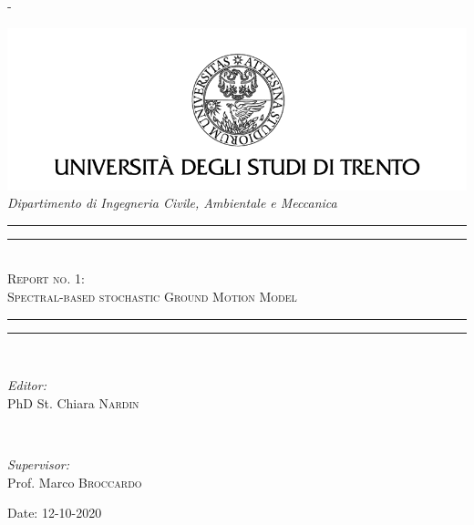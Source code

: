 \begin{titlingpage}
\begin{SingleSpace}
\calccentering{\unitlength} 
\begin{adjustwidth*}{\unitlength}{-\unitlength}
\begin{center}
\includegraphics[scale=1.5]{images/logo_bn.png}\\
{\Large \textit{Dipartimento di Ingegneria Civile, Ambientale e Meccanica}}\\
\vspace{5 mm}
\rule[0.5ex]{\linewidth}{2pt}\vspace*{-\baselineskip}\vspace*{3.2pt}
\rule[0.5ex]{\linewidth}{1pt}\\[\baselineskip]
{\Large \textsc{Report no. 1:}}\\[2.5mm]
{\Large \textsc{Spectral-based stochastic Ground Motion Model}}\\[2.5mm]
\rule[0.5ex]{\linewidth}{1pt}\vspace*{-\baselineskip}\vspace{3.2pt}
\rule[0.5ex]{\linewidth}{2pt}\\

\vspace{2.0cm}
\begin{minipage}[t]{0.5\textwidth}
\begin{flushleft} \large
\emph{Editor:} \\
PhD St. Chiara \textsc{Nardin}\\
\vspace{2.5cm}
\end{flushleft}
\end{minipage}
~
\begin{minipage}[t]{0.4\textwidth}
\begin{flushright} \large
\emph{Supervisor:}\\
Prof. Marco \textsc{Broccardo}  
\end{flushright}
\end{minipage}
\end{center}
\vspace{2cm}
\begin{center}
{\Large Date: 12-10-2020}
\end{center}
\end{adjustwidth*}
\end{SingleSpace}
\end{titlingpage}